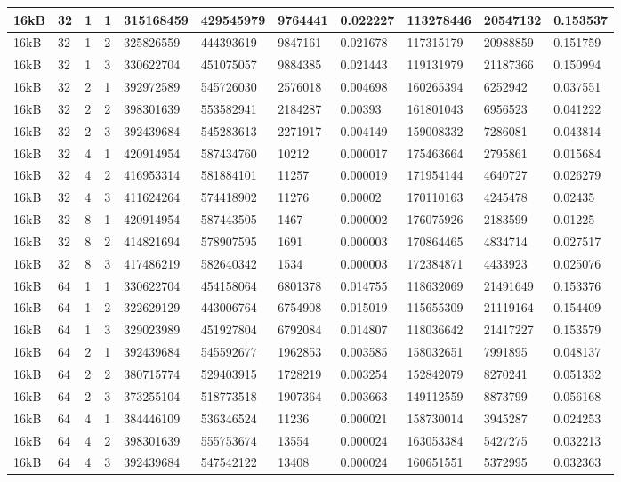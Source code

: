 \documentclass[conference]{IEEEtran}
\begin{document}
\begin{table}
\begin{tabular}{|m{.75cm} |m{.75cm} |m{.8cm} | m{.75cm} | l | l | l | l | l | l | l |}
    16kB&32&1&1&315168459&429545979&9764441&0.022227&113278446&20547132&0.153537\\ \hline
16kB&32&1&2&325826559&444393619&9847161&0.021678&117315179&20988859&0.151759\\ \hline
16kB&32&1&3&330622704&451075057&9884385&0.021443&119131979&21187366&0.150994\\ \hline
16kB&32&2&1&392972589&545726030&2576018&0.004698&160265394&6252942&0.037551\\ \hline
16kB&32&2&2&398301639&553582941&2184287&0.00393&161801043&6956523&0.041222\\ \hline
16kB&32&2&3&392439684&545283613&2271917&0.004149&159008332&7286081&0.043814\\ \hline
16kB&32&4&1&420914954&587434760&10212&0.000017&175463664&2795861&0.015684\\ \hline
16kB&32&4&2&416953314&581884101&11257&0.000019&171954144&4640727&0.026279\\ \hline
16kB&32&4&3&411624264&574418902&11276&0.00002&170110163&4245478&0.02435\\ \hline
16kB&32&8&1&420914954&587443505&1467&0.000002&176075926&2183599&0.01225\\ \hline
16kB&32&8&2&414821694&578907595&1691&0.000003&170864465&4834714&0.027517\\ \hline
16kB&32&8&3&417486219&582640342&1534&0.000003&172384871&4433923&0.025076\\ \hline
16kB&64&1&1&330622704&454158064&6801378&0.014755&118632069&21491649&0.153376\\ \hline
16kB&64&1&2&322629129&443006764&6754908&0.015019&115655309&21119164&0.154409\\ \hline
16kB&64&1&3&329023989&451927804&6792084&0.014807&118036642&21417227&0.153579\\ \hline
16kB&64&2&1&392439684&545592677&1962853&0.003585&158032651&7991895&0.048137\\ \hline
16kB&64&2&2&380715774&529403915&1728219&0.003254&152842079&8270241&0.051332\\ \hline
16kB&64&2&3&373255104&518773518&1907364&0.003663&149112559&8873799&0.056168\\ \hline
16kB&64&4&1&384446109&536346524&11236&0.000021&158730014&3945287&0.024253\\ \hline
16kB&64&4&2&398301639&555753674&13554&0.000024&163053384&5427275&0.032213\\ \hline
16kB&64&4&3&392439684&547542122&13408&0.000024&160651551&5372995&0.032363\\ \hline

\end{tabular}
\end{table}
\end{document}
